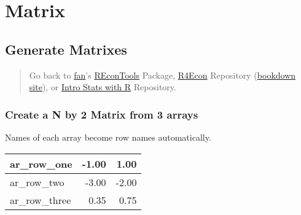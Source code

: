 \documentclass[
]{book}
\newenvironment{Shaded}{\begin{snugshade}}{\end{snugshade}}
\newcommand{\DecValTok}[1]{\textcolor[rgb]{0.00,0.00,0.81}{#1}}
\newcommand{\FloatTok}[1]{\textcolor[rgb]{0.00,0.00,0.81}{#1}}
\newcommand{\KeywordTok}[1]{\textcolor[rgb]{0.13,0.29,0.53}{\textbf{#1}}}
\newcommand{\NormalTok}[1]{#1}
\newcommand{\OperatorTok}[1]{\textcolor[rgb]{0.81,0.36,0.00}{\textbf{#1}}}
\newcommand{\StringTok}[1]{\textcolor[rgb]{0.31,0.60,0.02}{#1}}
\begin{document}
\hypertarget{matrix}{%
\section{Matrix}\label{matrix}}

\hypertarget{generate-matrixes}{%
\subsection{Generate Matrixes}\label{generate-matrixes}}

\begin{quote}
Go back to \href{http://fanwangecon.github.io/CodeDynaAsset/}{fan}'s \href{https://fanwangecon.github.io/REconTools/}{REconTools} Package, \href{https://fanwangecon.github.io/R4Econ/}{R4Econ} Repository (\href{https://fanwangecon.github.io/R4Econ/bookdown}{bookdown site}), or \href{https://fanwangecon.github.io/Stat4Econ/}{Intro Stats with R} Repository.
\end{quote}

\hypertarget{create-a-n-by-2-matrix-from-3-arrays}{%
\subsubsection{Create a N by 2 Matrix from 3 arrays}\label{create-a-n-by-2-matrix-from-3-arrays}}

Names of each array become row names automatically.

\begin{Shaded}
\end{Shaded}

\begin{table}[!h]
\centering
\begin{tabular}{l|r|r}
\hline
ar\_row\_one & -1.00 & 1.00\\
\hline
\rowcolor{gray!6}  ar\_row\_two & -3.00 & -2.00\\
\hline
ar\_row\_three & 0.35 & 0.75\\
\hline
\end{tabular}
\end{table}
\end{document}
